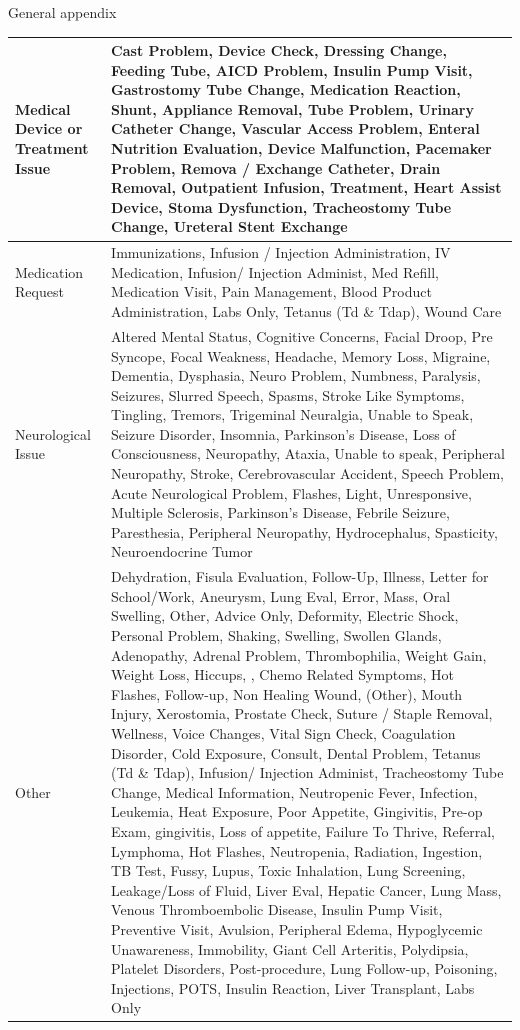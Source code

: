 \documentclass[,,nonblindrev]{informs}
\begin{document}
\begin{APPENDIX}{General appendix}
\begin{longtable}{|p{5cm}|p{12cm}|}
\hline
Medical Device or Treatment Issue & Cast Problem, Device Check, Dressing Change, Feeding Tube, AICD Problem, Insulin Pump Visit, Gastrostomy Tube Change, Medication Reaction, Shunt, Appliance Removal, Tube Problem, Urinary Catheter Change, Vascular Access Problem, Enteral Nutrition Evaluation, Device Malfunction, Pacemaker Problem, Remova /  Exchange Catheter, Drain Removal, Outpatient Infusion, Treatment, Heart Assist Device, Stoma Dysfunction, Tracheostomy Tube Change, Ureteral Stent Exchange \\
\hline
Medication Request & Immunizations, Infusion / Injection Administration, IV Medication, Infusion/ Injection Administ, Med Refill, Medication Visit, Pain Management, Blood Product Administration, Labs Only, Tetanus (Td \& Tdap), Wound Care \\
\hline
Neurological Issue & Altered Mental Status, Cognitive Concerns, Facial Droop, Pre Syncope, Focal Weakness, Headache, Memory Loss, Migraine, Dementia, Dysphasia, Neuro Problem, Numbness, Paralysis, Seizures, Slurred Speech, Spasms, Stroke Like Symptoms, Tingling, Tremors, Trigeminal Neuralgia, Unable to Speak, Seizure Disorder, Insomnia, Parkinson's Disease, Loss of Consciousness, Neuropathy, Ataxia, Unable to speak, Peripheral Neuropathy, Stroke, Cerebrovascular Accident, Speech Problem, Acute Neurological Problem, Flashes, Light, Unresponsive, Multiple Sclerosis, Parkinson's Disease, Febrile Seizure, Paresthesia, Peripheral Neuropathy, Hydrocephalus, Spasticity, Neuroendocrine Tumor \\
\hline
Other & Dehydration, Fisula Evaluation, Follow-Up, Illness, Letter for School/Work, Aneurysm, Lung Eval, Error, Mass, Oral Swelling, Other, Advice Only, Deformity, Electric Shock, Personal Problem, Shaking, Swelling, Swollen Glands, Adenopathy, Adrenal Problem, Thrombophilia, Weight Gain, Weight Loss, Hiccups, , Chemo Related Symptoms, Hot Flashes, Follow-up, Non Healing Wound, (Other), Mouth Injury, Xerostomia, Prostate Check, Suture / Staple Removal, Wellness, Voice Changes, Vital Sign Check, Coagulation Disorder, Cold Exposure, Consult, Dental Problem, Tetanus (Td \& Tdap), Infusion/ Injection Administ, Tracheostomy Tube Change, Medical Information, Neutropenic Fever, Infection, Leukemia, Heat Exposure, Poor Appetite, Gingivitis, Pre-op Exam, gingivitis, Loss of appetite, Failure To Thrive, Referral, Lymphoma, Hot Flashes, Neutropenia, Radiation, Ingestion, TB Test, Fussy, Lupus, Toxic Inhalation, Lung Screening, Leakage/Loss of Fluid, Liver Eval, Hepatic Cancer, Lung Mass, Venous Thromboembolic Disease, Insulin Pump Visit, Preventive Visit, Avulsion, Peripheral Edema, Hypoglycemic Unawareness, Immobility, Giant Cell Arteritis, Polydipsia, Platelet Disorders, Post-procedure, Lung Follow-up, Poisoning, Injections, POTS, Insulin Reaction, Liver Transplant, Labs Only \\

\end{longtable}
\end{APPENDIX}
\end{document}
